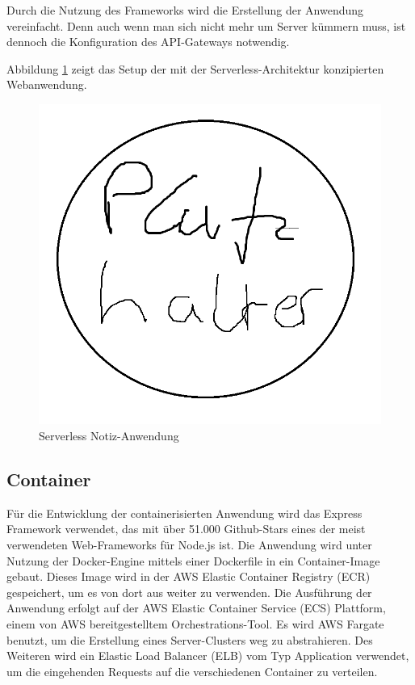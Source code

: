 Durch die Nutzung des Frameworks wird die Erstellung der Anwendung vereinfacht. Denn auch wenn man sich nicht mehr um Server kümmern muss, ist dennoch die Konfiguration des API-Gateways notwendig.

Abbildung \ref{fig:notes-serverless} zeigt das Setup der mit der Serverless-Architektur konzipierten Webanwendung.

\begin{figure}[H]
    \includegraphics[width=\textwidth]{img/platzhalter.png}
    \caption[Serverless Notiz-Anwendung]{Serverless Notiz-Anwendung}
    \label{fig:notes-serverless}
\end{figure}

\subsection{Container}
Für die Entwicklung der containerisierten Anwendung wird das Express Framework verwendet, das mit über 51.000 Github-Stars eines der meist verwendeten Web-Frameworks für Node.js ist. Die Anwendung wird unter Nutzung der Docker-Engine mittels einer Dockerfile in ein Container-Image gebaut. Dieses Image wird in der AWS Elastic Container Registry (ECR) gespeichert, um es von dort aus weiter zu verwenden. 
Die Ausführung der Anwendung erfolgt auf der AWS Elastic Container Service (ECS) Plattform, einem von AWS bereitgestelltem Orchestrations-Tool. Es wird AWS Fargate benutzt, um die Erstellung eines Server-Clusters weg zu abstrahieren. Des Weiteren wird ein Elastic Load Balancer (ELB) vom Typ Application verwendet, um die eingehenden Requests auf die verschiedenen Container zu verteilen. 

